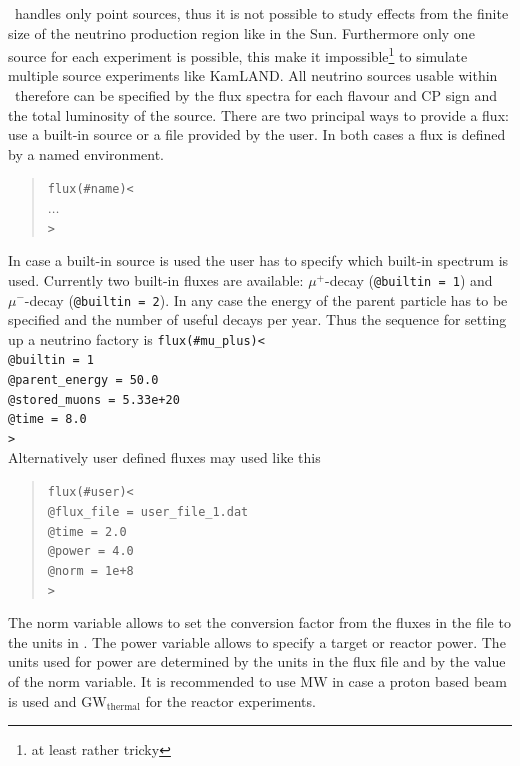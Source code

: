 \GLOBES\ handles only point sources, thus it is not possible
to study effects from the finite size of the neutrino production
region like in the Sun. Furthermore only one source for each experiment
is possible, this make it impossible\footnote{at least rather tricky} 
to simulate multiple source experiments like KamLAND. All neutrino
sources usable within \GLOBES\ therefore can be specified by the
flux spectra for each flavour and CP sign and the total luminosity
of the source. There are two principal ways to provide a flux:
use a built-in source or a file provided by the user. In both cases
a flux is defined by a named environment.
\begin{quote}
  {\tt flux(\#name)<\\
\tb $\ldots$\\
>}
\end{quote}


In case a built-in source is used the user has to specify which
built-in spectrum is used. Currently two built-in fluxes are available:
$\mu^+$-decay ({\tt @builtin = 1}) and $\mu^-$-decay ({\tt @builtin = 2}).
In any case  the energy of the parent particle has to be specified
and the number of useful decays per year. Thus the sequence for setting
up a neutrino factory is
{\tt flux(\#mu\_plus)<\\
\tb  @builtin = 1\\
\tb  @parent\_energy = 50.0\\
\tb  @stored\_muons = 5.33e+20\\
\tb  @time = 8.0\\
>}\\

Alternatively user defined fluxes may used like this
\begin{quote}
{\tt flux(\#user)<}\\
{\tt \tb @flux\_file = user\_file\_1.dat\\
\tb @time = 2.0\\
\tb @power = 4.0\\
\tb @norm = 1e+8}\\
{\tt >}
\end{quote}
 
The norm variable allows to set the conversion factor from the fluxes in
the file to the units in \GLOBES. The power variable allows to
specify a target or reactor power. The units used for power are determined
by the units in the flux file and by the value of the norm variable. It is
recommended to use $\mathrm{MW}$ in case a proton based beam is used and
$\mathrm{GW}_\mathrm{thermal}$ for the reactor experiments.



